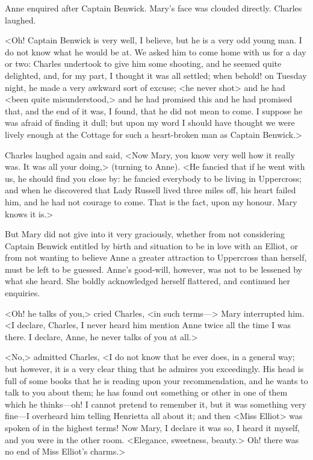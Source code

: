 Anne enquired after Captain Benwick. Mary's face was clouded directly. Charles laughed.

<Oh! Captain Benwick is very well, I believe, but he is a very odd young man. I do not know what he would be at. We asked him to come home with us for a day or two: Charles undertook to give him some shooting, and he seemed quite delighted, and, for my part, I thought it was all settled; when behold! on Tuesday night, he made a very awkward sort of excuse; <he never shot> and he had <been quite misunderstood,> and he had promised this and he had promised that, and the end of it was, I found, that he did not mean to come. I suppose he was afraid of finding it dull; but upon my word I should have thought we were lively enough at the Cottage for such a heart-broken man as Captain Benwick.>

Charles laughed again and said, <Now Mary, you know very well how it really was. It was all your doing,> (turning to Anne). <He fancied that if he went with us, he should find you close by: he fancied everybody to be living in Uppercross; and when he discovered that Lady Russell lived three miles off, his heart failed him, and he had not courage to come. That is the fact, upon my honour. Mary knows it is.>

But Mary did not give into it very graciously, whether from not considering Captain Benwick entitled by birth and situation to be in love with an Elliot, or from not wanting to believe Anne a greater attraction to Uppercross than herself, must be left to be guessed. Anne's good-will, however, was not to be lessened by what she heard. She boldly acknowledged herself flattered, and continued her enquiries.

<Oh! he talks of you,> cried Charles, <in such terms—> Mary interrupted him. <I declare, Charles, I never heard him mention Anne twice all the time I was there. I declare, Anne, he never talks of you at all.>

<No,> admitted Charles, <I do not know that he ever does, in a general way; but however, it is a very clear thing that he admires you exceedingly. His head is full of some books that he is reading upon your recommendation, and he wants to talk to you about them; he has found out something or other in one of them which he thinks—oh! I cannot pretend to remember it, but it was something very fine—I overheard him telling Henrietta all about it; and then <Miss Elliot> was spoken of in the highest terms! Now Mary, I declare it was so, I heard it myself, and you were in the other room. <Elegance, sweetness, beauty.> Oh! there was no end of Miss Elliot's charms.>

